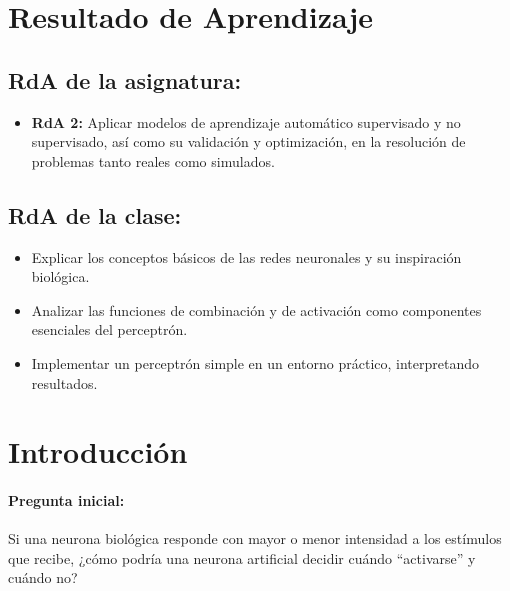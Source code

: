 \documentclass[a4,11pt]{aleph-notas}
\begin{document}
\encabezado

\section*{Resultado de Aprendizaje}

\subsection*{RdA de la asignatura:}
\begin{itemize}[leftmargin=*]
    \item \textbf{RdA 2:} Aplicar modelos de aprendizaje automático supervisado y no supervisado, así como su validación y optimización, en la resolución de problemas tanto reales como simulados.
\end{itemize}

\subsection*{RdA de la clase:}
\begin{itemize}[leftmargin=*]
    \item Explicar los conceptos básicos de las redes neuronales y su inspiración biológica.
    \item Analizar las funciones de combinación y de activación como componentes esenciales del perceptrón.
    \item Implementar un perceptrón simple en un entorno práctico, interpretando resultados.
\end{itemize}

\section*{Introducción}

\paragraph{Pregunta inicial:} 
Si una neurona biológica responde con mayor o menor intensidad a los estímulos que recibe, ¿cómo podría una neurona artificial decidir cuándo “activarse” y cuándo no?
\end{document}
